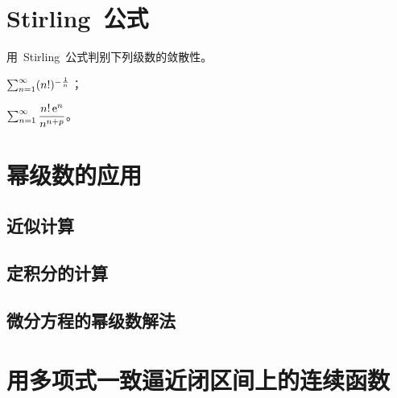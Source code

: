 \pushstar
\section{Stirling~公式}
\popstar

\begin{exercise}
\item 用~Stirling~公式判别下列级数的敛散性。
\begin{exlistcols}
  \item $\sum_{n=1}^\infty(n!)^{-\frac1n}$；
  \item $\sum_{n=1}^\infty\dfrac{n!\,\mathrm e^n}{n^{n+p}}$。
\end{exlistcols}
\end{exercise}

\section{幂级数的应用}
\subsection{近似计算}
\subsection{定积分的计算}
\subsection{微分方程的幂级数解法}

\section{用多项式一致逼近闭区间上的连续函数}

